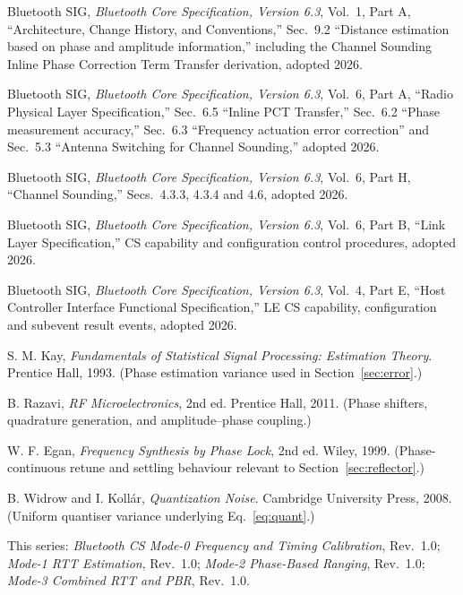 \documentclass[11pt,a4paper]{article}
\begin{document}
\begin{enumerate}[label={[\arabic*]},leftmargin=2.2em,itemsep=3pt]
\item Bluetooth SIG, \emph{Bluetooth Core Specification, Version 6.3}, Vol.\ 1, Part A,
  ``Architecture, Change History, and Conventions,'' Sec.\ 9.2 ``Distance estimation based on phase
  and amplitude information,'' including the Channel Sounding Inline Phase Correction Term Transfer
  derivation, adopted 2026.

\item Bluetooth SIG, \emph{Bluetooth Core Specification, Version 6.3}, Vol.\ 6, Part A,
  ``Radio Physical Layer Specification,'' Sec.\ 6.5 ``Inline PCT Transfer,'' Sec.\ 6.2 ``Phase
  measurement accuracy,'' Sec.\ 6.3 ``Frequency actuation error correction'' and Sec.\ 5.3
  ``Antenna Switching for Channel Sounding,'' adopted 2026.

\item Bluetooth SIG, \emph{Bluetooth Core Specification, Version 6.3}, Vol.\ 6, Part H,
  ``Channel Sounding,'' Secs.\ 4.3.3, 4.3.4 and 4.6, adopted 2026.

\item Bluetooth SIG, \emph{Bluetooth Core Specification, Version 6.3}, Vol.\ 6, Part B,
  ``Link Layer Specification,'' CS capability and configuration control procedures, adopted 2026.

\item Bluetooth SIG, \emph{Bluetooth Core Specification, Version 6.3}, Vol.\ 4, Part E,
  ``Host Controller Interface Functional Specification,'' LE CS capability, configuration and
  subevent result events, adopted 2026.

\item S. M. Kay, \emph{Fundamentals of Statistical Signal Processing: Estimation Theory}.
  Prentice Hall, 1993. (Phase estimation variance used in Section~\ref{sec:error}.)

\item B. Razavi, \emph{RF Microelectronics}, 2nd ed. Prentice Hall, 2011. (Phase shifters, quadrature
  generation, and amplitude--phase coupling.)

\item W. F. Egan, \emph{Frequency Synthesis by Phase Lock}, 2nd ed. Wiley, 1999. (Phase-continuous
  retune and settling behaviour relevant to Section~\ref{sec:reflector}.)

\item B. Widrow and I. Koll\'ar, \emph{Quantization Noise}. Cambridge University Press, 2008.
  (Uniform quantiser variance underlying Eq.~\eqref{eq:quant}.)

\item This series: \emph{Bluetooth CS Mode-0 Frequency and Timing Calibration}, Rev.\ 1.0;
  \emph{Mode-1 RTT Estimation}, Rev.\ 1.0; \emph{Mode-2 Phase-Based Ranging}, Rev.\ 1.0;
  \emph{Mode-3 Combined RTT and PBR}, Rev.\ 1.0.
\end{enumerate}
\end{document}
